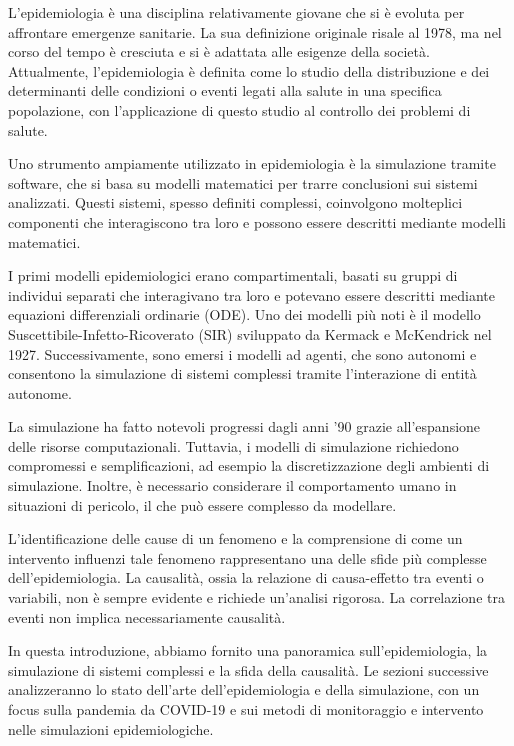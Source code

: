 L'epidemiologia è una disciplina relativamente giovane che si è evoluta 
per affrontare emergenze sanitarie. La sua definizione originale risale 
al 1978, ma nel corso del tempo è cresciuta e si è adattata alle esigenze 
della società. Attualmente, l'epidemiologia è definita come lo studio 
della distribuzione e dei determinanti delle condizioni o eventi legati 
alla salute in una specifica popolazione, con l'applicazione di questo 
studio al controllo dei problemi di salute.

Uno strumento ampiamente utilizzato in epidemiologia è la simulazione 
tramite software, che si basa su modelli matematici per trarre conclusioni 
sui sistemi analizzati. Questi sistemi, spesso definiti complessi, 
coinvolgono molteplici componenti che interagiscono tra loro e possono 
essere descritti mediante modelli matematici.

I primi modelli epidemiologici erano compartimentali, basati su gruppi di 
individui separati che interagivano tra loro e potevano essere descritti 
mediante equazioni differenziali ordinarie (ODE). Uno dei modelli più noti 
è il modello Suscettibile-Infetto-Ricoverato (SIR) sviluppato da 
Kermack e McKendrick nel 1927. Successivamente, sono emersi i modelli ad 
agenti, che sono autonomi e consentono la simulazione di sistemi complessi 
tramite l'interazione di entità autonome.

La simulazione ha fatto notevoli progressi dagli anni '90 grazie 
all'espansione delle risorse computazionali. Tuttavia, i modelli di 
simulazione richiedono compromessi e semplificazioni, ad esempio la 
discretizzazione degli ambienti di simulazione. Inoltre, è necessario 
considerare il comportamento umano in situazioni di pericolo, il che può 
essere complesso da modellare.

L'identificazione delle cause di un fenomeno e la comprensione di come un 
intervento influenzi tale fenomeno rappresentano una delle sfide più 
complesse dell'epidemiologia. La causalità, ossia la relazione di 
causa-effetto tra eventi o variabili, non è sempre evidente e richiede 
un'analisi rigorosa. La correlazione tra eventi non implica 
necessariamente causalità.

In questa introduzione, abbiamo fornito una panoramica sull'epidemiologia, 
la simulazione di sistemi complessi e la sfida della causalità. 
Le sezioni successive analizzeranno lo stato dell'arte dell'epidemiologia 
e della simulazione, con un focus sulla pandemia da COVID-19 e sui metodi 
di monitoraggio e intervento nelle simulazioni epidemiologiche.